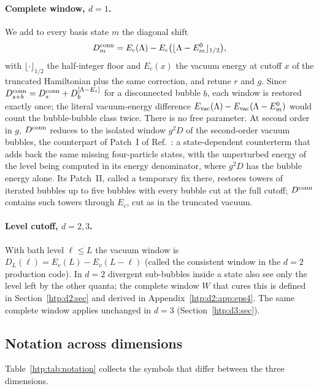 \paragraph{Complete window, $d=1$.} We add to every basis state $m$ the diagonal shift
\begin{equation}
 D^{\rm conn}_m=E_c(\Lambda)-E_c\big(\lfloor\Lambda-E^0_m\rfloor_{1/2}\big),
 \label{htp:eq:Dconn}
\end{equation}
with $\lfloor\cdot\rfloor_{1/2}$ the half-integer floor and $E_c(x)$ the vacuum energy at cutoff $x$ of the truncated
Hamiltonian plus the same correction, and retune $r$ and $g$. Since $D^{\rm conn}_{s+b}=D^{\rm conn}_s+D^{[\Lambda-E_s]}_b$
for a disconnected bubble $b$, each window is restored exactly once; the literal vacuum-energy difference
$E_{\rm vac}(\Lambda)-E_{\rm vac}(\Lambda-E^0_m)$ would count the bubble-bubble class twice. There is no free parameter.
At second order in $g$, $D^{\rm conn}$ reduces to the isolated window $g^2D$ of the second-order vacuum bubbles, the
counterpart of Patch~I of Ref.~\cite{htp:Elias-Miro:2020qwz}: a state-dependent counterterm that adds back the same missing
four-particle states, with the unperturbed energy of the level being computed in its energy denominator, where $g^2D$
has the bubble energy alone. Its Patch~II, called a temporary fix there, restores towers of iterated bubbles up to five bubbles with every bubble cut at the full cutoff; $D^{\rm conn}$
contains such towers through $E_c$, cut as in the truncated vacuum.

\paragraph{Level cutoff, $d=2,3$.} With bath level $\ell\le L$ the vacuum window is $D_L(\ell)=E_v(L)-E_v(L-\ell)$
(called the consistent window in the $d=2$ production code). In $d=2$ divergent sub-bubbles inside a state also see only
the level left by the other quanta; the complete window $W$ that cures this is defined in Section~\ref{htp:d2:sec} and derived in Appendix~\ref{htp:d2:app:eps4}. The
same complete window applies unchanged in $d=3$ (Section~\ref{htp:d3:sec}).

\subsection{Notation across dimensions}\label{htp:sec:notation}
Table~\ref{htp:tab:notation} collects the symbols that differ between the three dimensions.

